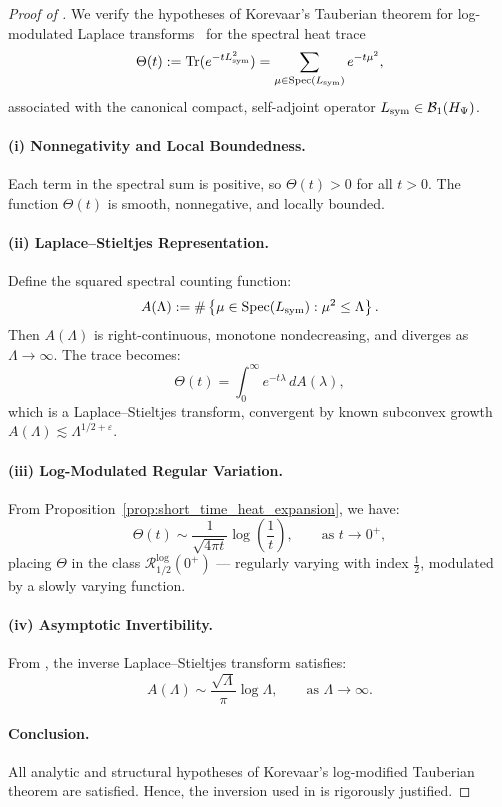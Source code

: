 \begin{proof}[Proof of ]
We verify the hypotheses of Korevaar’s Tauberian theorem for log-modulated Laplace transforms~\cite[Ch.~III, Thm.~5.5]{Korevaar2004Tauberian} for the spectral heat trace
\[
\Theta(t) := \operatorname{Tr}(e^{-t L_{\mathrm{sym}}^2}) = \sum_{\mu \in \operatorname{Spec}(L_{\mathrm{sym}})} e^{-t \mu^2},
\]
associated with the canonical compact, self-adjoint operator \( L_{\mathrm{sym}} \in \mathcal{B}_1(H_{\Psi}) \).

\paragraph{(i) Nonnegativity and Local Boundedness.}
Each term in the spectral sum is positive, so \( \Theta(t) > 0 \) for all \( t > 0 \). The function \( \Theta(t) \) is smooth, nonnegative, and locally bounded.

\paragraph{(ii) Laplace–Stieltjes Representation.}
Define the squared spectral counting function:
\[
A(\Lambda) := \#\left\{ \mu \in \operatorname{Spec}(L_{\mathrm{sym}}) : \mu^2 \le \Lambda \right\}.
\]
Then \( A(\Lambda) \) is right-continuous, monotone nondecreasing, and diverges as \( \Lambda \to \infty \). The trace becomes:
\[
\Theta(t) = \int_0^\infty e^{-t \lambda} \, dA(\lambda),
\]
which is a Laplace–Stieltjes transform, convergent by known subconvex growth \( A(\Lambda) \lesssim \Lambda^{1/2 + \varepsilon} \).

\paragraph{(iii) Log-Modulated Regular Variation.}
From Proposition~\ref{prop:short_time_heat_expansion}, we have:
\[
\Theta(t) \sim \frac{1}{\sqrt{4\pi t}} \log\left( \frac{1}{t} \right), \qquad \text{as } t \to 0^+,
\]
placing \( \Theta \) in the class \( \mathcal{R}^{\log}_{1/2}(0^+) \) — regularly varying with index \( \tfrac{1}{2} \), modulated by a slowly varying function.

\paragraph{(iv) Asymptotic Invertibility.}
From , the inverse Laplace–Stieltjes transform satisfies:
\[
A(\Lambda) \sim \frac{\sqrt{\Lambda}}{\pi} \log \Lambda, \qquad \text{as } \Lambda \to \infty.
\]

\paragraph{Conclusion.}
All analytic and structural hypotheses of Korevaar’s log-modified Tauberian theorem are satisfied. Hence, the inversion used in  is rigorously justified.
\end{proof}
